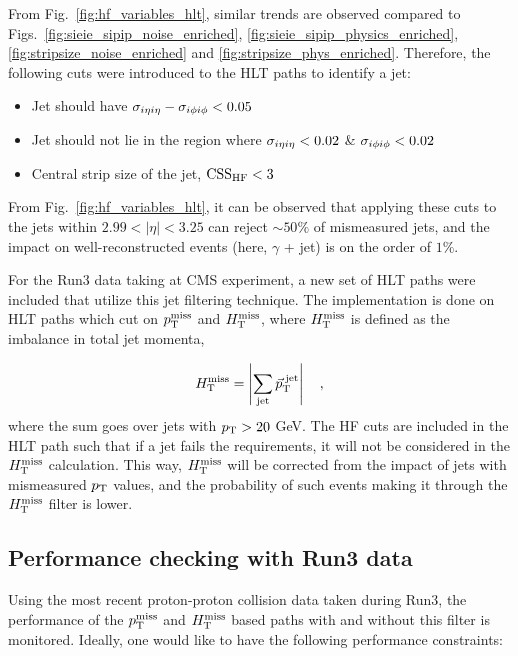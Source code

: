 From Fig.~\ref{fig:hf_variables_hlt}, similar trends are observed compared to Figs.~\ref{fig:sieie_sipip_noise_enriched}, \ref{fig:sieie_sipip_physics_enriched}, 
\ref{fig:stripsize_noise_enriched} and \ref{fig:stripsize_phys_enriched}. Therefore, the following cuts were introduced to the HLT paths to identify a jet:

\begin{itemize}
    \item Jet should have $\sigma_{i\eta i\eta} - \sigma_{i\phi i\phi} < 0.05$
    \item Jet should not lie in the region where $\sigma_{i\eta i\eta} < 0.02$ \& $\sigma_{i\phi i\phi} < 0.02$
    \item Central strip size of the jet, $\mathrm{CSS_{HF}} < 3$
\end{itemize}

From Fig.~\ref{fig:hf_variables_hlt}, it can be observed that applying these cuts to the jets within $2.99 < |\eta| < 3.25$ can reject $\sim 50\%$ of mismeasured
jets, and the impact on well-reconstructed events (here, $\gamma$ + jet) is on the order of $1\%$. 

For the Run3 data taking at CMS experiment, a new set of HLT paths were included that utilize this jet filtering technique. The implementation is
done on HLT paths which cut on $p_{\textrm{T}}^{\textrm{miss}}$ and $H_{\mathrm{T}}^{\mathrm{miss}}$, where $H_{\mathrm{T}}^{\mathrm{miss}}$ is defined as the imbalance in total jet momenta,

\begin{equation}
    H_{\mathrm{T}}^{\mathrm{miss}} = \left| \sum_{\mathrm{jet}} {\vec p}_{\mathrm{T}}^{\;\text{jet}} \right| \quad ,
    \label{eq:htmiss_def}
\end{equation}
where the sum goes over jets with $p_{\textrm{T}} > 20$ GeV. The HF cuts are included in the HLT path such that if a jet fails the requirements, it will not be considered
in the $H_{\mathrm{T}}^{\mathrm{miss}}$ calculation. This way, $H_{\mathrm{T}}^{\mathrm{miss}}$ will be corrected from the impact of jets with mismeasured $p_{\textrm{T}}$ values, and the probability of such events
making it through the $H_{\mathrm{T}}^{\mathrm{miss}}$ filter is lower.

\subsection{Performance checking with Run3 data}
\label{subsec:trig_perf_check_run3}

Using the most recent proton-proton collision data taken during Run3, the performance of the $p_{\textrm{T}}^{\textrm{miss}}$ and $H_{\mathrm{T}}^{\mathrm{miss}}$ based paths with and without this filter is
monitored. Ideally, one would like to have the following performance constraints:


